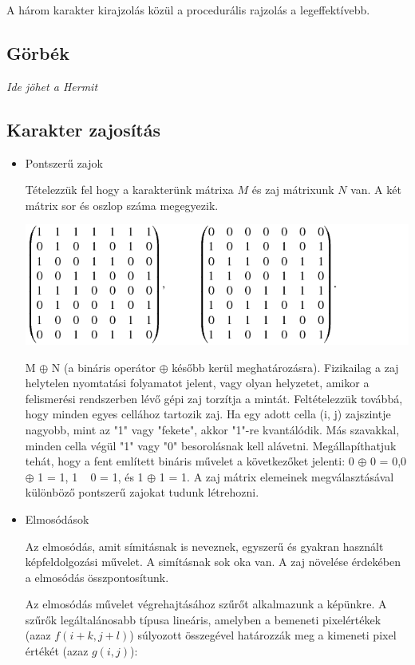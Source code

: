 A három karakter kirajzolás közül a procedurális rajzolás a legeffektívebb.

\subsection{Görbék}
\textit{Ide jöhet a Hermit}

\subsection{Karakter zajosítás}
\begin{itemize}
\item Pontszerű zajok

Tételezzük fel hogy a karakterünk mátrixa $M$ és zaj mátrixunk $N$ van. A két mátrix sor és oszlop száma megegyezik.

\begin{center}
\includegraphics[scale=0.6]{images/noise_matrix}
\end{center}

M $\oplus$ N (a bináris operátor $\oplus$ később kerül meghatározásra). Fizikailag a zaj helytelen nyomtatási folyamatot jelent, vagy olyan helyzetet, amikor a felismerési rendszerben lévő gépi zaj torzítja a mintát. Feltételezzük továbbá, hogy minden egyes cellához tartozik zaj.
Ha egy adott cella (i, j) zajszintje nagyobb, mint az "1" vagy "fekete", akkor "1"-re kvantálódik. Más szavakkal, minden cella végül "1" vagy "0" besorolásnak kell alávetni. Megállapíthatjuk tehát, hogy a fent említett bináris művelet a következőket jelenti: 0 $\oplus$ 0 = 0,0 $\oplus$ 1 = 1, 1 ~ 0 = 1, és 1 $\oplus$ 1 = 1.
A zaj mátrix elemeinek megválasztásával különböző pontszerű zajokat tudunk létrehozni.
\item Elmosódások

Az elmosódás, amit símitásnak is neveznek, egyszerű és gyakran használt képfeldolgozási művelet. A simításnak sok oka van. A zaj növelése érdekében a elmosódás összpontosítunk.

Az elmosódás művelet végrehajtásához szűrőt alkalmazunk a képünkre. A szűrők legáltalánosabb típusa lineáris, amelyben a bemeneti pixelértékek (azaz $f(i+k, j+l)$) súlyozott összegével határozzák meg a kimeneti pixel értékét (azaz $g(i, j)$):


\end{itemize}
